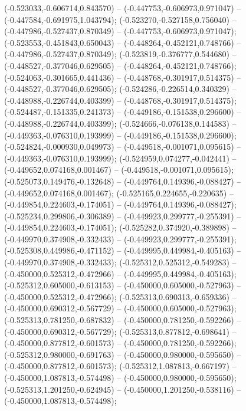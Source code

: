  (-0.523033,-0.606714,0.843570) -- (-0.447753,-0.606973,0.971047) -- (-0.447584,-0.691975,1.043794);
 (-0.523270,-0.527158,0.756040) -- (-0.447986,-0.527437,0.870349) -- (-0.447753,-0.606973,0.971047);
 (-0.523553,-0.451843,0.650043) -- (-0.448264,-0.452121,0.748766) -- (-0.447986,-0.527437,0.870349);
 (-0.523819,-0.376777,0.544680) -- (-0.448527,-0.377046,0.629505) -- (-0.448264,-0.452121,0.748766);
 (-0.524063,-0.301665,0.441436) -- (-0.448768,-0.301917,0.514375) -- (-0.448527,-0.377046,0.629505);
 (-0.524286,-0.226514,0.340329) -- (-0.448988,-0.226744,0.403399) -- (-0.448768,-0.301917,0.514375);
 (-0.524487,-0.151335,0.241373) -- (-0.449186,-0.151538,0.296600) -- (-0.448988,-0.226744,0.403399);
 (-0.524666,-0.076138,0.144583) -- (-0.449363,-0.076310,0.193999) -- (-0.449186,-0.151538,0.296600);
 (-0.524824,-0.000930,0.049973) -- (-0.449518,-0.001071,0.095615) -- (-0.449363,-0.076310,0.193999);
 (-0.524959,0.074277,-0.042441) -- (-0.449652,0.074168,0.001467) -- (-0.449518,-0.001071,0.095615);
 (-0.525073,0.149476,-0.132648) -- (-0.449764,0.149396,-0.088427) -- (-0.449652,0.074168,0.001467);
 (-0.525165,0.224655,-0.220635) -- (-0.449854,0.224603,-0.174051) -- (-0.449764,0.149396,-0.088427);
 (-0.525234,0.299806,-0.306389) -- (-0.449923,0.299777,-0.255391) -- (-0.449854,0.224603,-0.174051);
 (-0.525282,0.374920,-0.389898) -- (-0.449970,0.374908,-0.332433) -- (-0.449923,0.299777,-0.255391);
 (-0.525308,0.449986,-0.471152) -- (-0.449995,0.449984,-0.405163) -- (-0.449970,0.374908,-0.332433);
 (-0.525312,0.525312,-0.549283) -- (-0.450000,0.525312,-0.472966) -- (-0.449995,0.449984,-0.405163);
 (-0.525312,0.605000,-0.613153) -- (-0.450000,0.605000,-0.527963) -- (-0.450000,0.525312,-0.472966);
 (-0.525313,0.690313,-0.659336) -- (-0.450000,0.690312,-0.567729) -- (-0.450000,0.605000,-0.527963);
 (-0.525313,0.781250,-0.687832) -- (-0.450000,0.781250,-0.592266) -- (-0.450000,0.690312,-0.567729);
 (-0.525313,0.877812,-0.698641) -- (-0.450000,0.877812,-0.601573) -- (-0.450000,0.781250,-0.592266);
 (-0.525312,0.980000,-0.691763) -- (-0.450000,0.980000,-0.595650) -- (-0.450000,0.877812,-0.601573);
 (-0.525312,1.087813,-0.667197) -- (-0.450000,1.087813,-0.574498) -- (-0.450000,0.980000,-0.595650);
 (-0.525313,1.201250,-0.624945) -- (-0.450000,1.201250,-0.538116) -- (-0.450000,1.087813,-0.574498);
